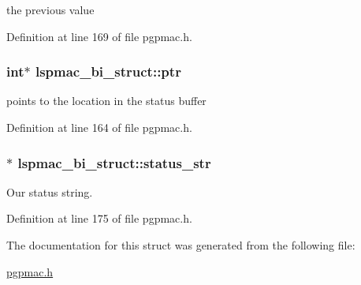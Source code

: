 the previous value 



Definition at line 169 of file pgpmac.\-h.

\hypertarget{structlspmac__bi__struct_ae201bf05130bcb6985704ea42efabeb3}{
\subsubsection[{ptr}]{\setlength{\rightskip}{0pt plus 5cm}int$\ast$ lspmac\-\_\-bi\-\_\-struct\-::ptr}}\label{structlspmac__bi__struct_ae201bf05130bcb6985704ea42efabeb3}


points to the location in the status buffer 



Definition at line 164 of file pgpmac.\-h.

\hypertarget{structlspmac__bi__struct_af934ce1b86836602a626c3d27627b66e}{
\subsubsection[{status\-\_\-str}]{$\ast$ lspmac\-\_\-bi\-\_\-struct\-::status\-\_\-str}}\label{structlspmac__bi__struct_af934ce1b86836602a626c3d27627b66e}


Our status string. 



Definition at line 175 of file pgpmac.\-h.



The documentation for this struct was generated from the following file\-:\begin{DoxyCompactItemize}
\item 
\hyperlink{pgpmac_8h}{pgpmac.\-h}\end{DoxyCompactItemize}
